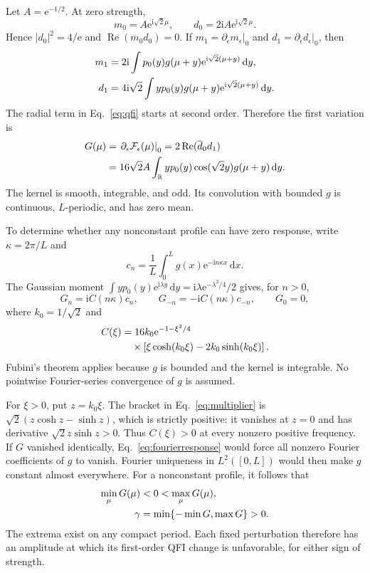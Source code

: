 \documentclass[aps,pra,reprint,amsmath,amssymb,nofootinbib,floatfix]{revtex4-2}
\newcommand{\Rea}{\operatorname{Re}}
\newcommand{\dd}{\mathrm{d}}
\newcommand{\ii}{\mathrm{i}}
\newcommand{\ee}{\mathrm{e}}
\begin{document}
Let $A=\ee^{-1/2}$. At zero strength,
\begin{equation}
 m_0=A\ee^{\ii\sqrt2\mu},\qquad
 d_0=2\ii A\ee^{\ii\sqrt2\mu}.
 \label{eq:zerodata}
\end{equation}
Hence $|d_0|^2=4/\ee$ and
$\Rea(\overline m_0d_0)=0$. If $m_1=\partial_\epsilon m_\epsilon|_0$
and $d_1=\partial_\epsilon d_\epsilon|_0$, then
\begin{align}
 m_1&=2\ii\int p_0(y)g(\mu+y)
 \ee^{\ii\sqrt2(\mu+y)}\,\dd y,\notag\\
 d_1&=4\ii\sqrt2\int y p_0(y)g(\mu+y)
 \ee^{\ii\sqrt2(\mu+y)}\,\dd y.
 \label{eq:firstdata}
\end{align}
The radial term in Eq.~\eqref{eq:qfi} starts at second order. Therefore
the first variation is
\begin{align}
 G(\mu)&=\left.\partial_\epsilon\mathcal F_\epsilon(\mu)\right|_0
 =2\Rea(\overline d_0d_1)\notag\\
 &=16\sqrt2 A\int_{\mathbb R}y p_0(y)
 \cos(\sqrt2y)g(\mu+y)\,\dd y.
 \label{eq:response}
\end{align}
The kernel is smooth, integrable, and odd. Its convolution with bounded
$g$ is continuous, $L$-periodic, and has zero mean.

To determine whether any nonconstant profile can have zero response,
write $\kappa=2\pi/L$ and
\begin{equation}
 c_n=\frac1L\int_0^L g(x)\ee^{-\ii n\kappa x}\,\dd x.
\end{equation}
The Gaussian moment
$\int y p_0(y)\ee^{\ii\lambda y}\,\dd y
=\ii\lambda\ee^{-\lambda^2/4}/2$ gives, for $n>0$,
\begin{equation}
 G_n=\ii C(n\kappa)c_n,\qquad
 G_{-n}=-\ii C(n\kappa)c_{-n},\qquad G_0=0,
 \label{eq:fourierresponse}
\end{equation}
where $k_0=1/\sqrt2$ and
\begin{align}
 C(\xi)&=16k_0\ee^{-1-\xi^2/4}\notag\\
 &\quad\times\left[\xi\cosh(k_0\xi)-2k_0\sinh(k_0\xi)\right].
 \label{eq:multiplier}
\end{align}
Fubini's theorem applies because $g$ is bounded and the kernel is
integrable. No pointwise Fourier-series convergence of $g$ is assumed.

For $\xi>0$, put $z=k_0\xi$. The bracket in
Eq.~\eqref{eq:multiplier} is
$\sqrt2(z\cosh z-\sinh z)$, which is strictly positive: it vanishes
at $z=0$ and has derivative $\sqrt2 z\sinh z>0$.
Thus $C(\xi)>0$ at every nonzero positive frequency.
If $G$ vanished identically, Eq.~\eqref{eq:fourierresponse} would force
all nonzero Fourier coefficients of $g$ to vanish. Fourier uniqueness
in $L^2([0,L])$ would then make $g$ constant almost everywhere.
For a nonconstant profile, it follows that
\begin{align}
 \min_\mu G(\mu)&<0<\max_\mu G(\mu),\notag\\
 \gamma&=\min\{-\min G,\max G\}>0.
 \label{eq:gamma}
\end{align}
The extrema exist on any compact period. Each fixed perturbation therefore
has an amplitude at which its first-order QFI change is unfavorable,
for either sign of strength.
\end{document}
